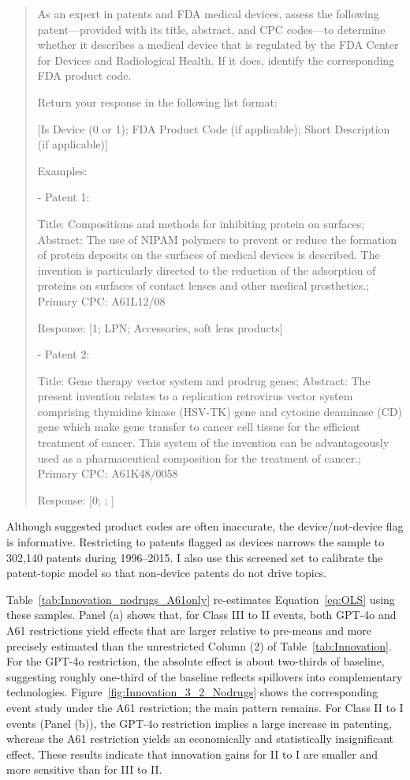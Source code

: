\documentclass[letterpaper,12pt]{article}
\theoremstyle{definition}
\begin{document}
\begin{quote}
As an expert in patents and FDA medical devices, assess the following patent---provided with its title, abstract, and CPC codes---to determine whether it describes a medical device that is regulated by the FDA Center for Devices and Radiological Health. If it does, identify the corresponding FDA product code.

Return your response in the following list format:

[Is Device (0 or 1); FDA Product Code (if applicable); Short Description (if applicable)]

Examples:

- Patent 1:

  Title: Compositions and methods for inhibiting protein on surfaces; 
  Abstract: The use of NIPAM polymers to prevent or reduce the formation of protein deposits on the surfaces of medical devices is described. The invention is particularly directed to the reduction of the adsorption of proteins on surfaces of contact lenses and other medical prosthetics.; 
  Primary CPC: A61L12/08

  Response: [1; LPN; Accessories, soft lens products]

- Patent 2:

  Title: Gene therapy vector system and prodrug genes; 
  Abstract: The present invention relates to a replication retrovirus vector system comprising thymidine kinase (HSV-TK) gene and cytosine deaminase (CD) gene which make gene transfer to cancer cell tissue for the efficient treatment of cancer. This system of the invention can be advantageously used as a pharmaceutical composition for the treatment of cancer.; 
  Primary CPC: A61K48/0058

  Response: [0; ; ]
\end{quote}



Although suggested product codes are often inaccurate, the device/not-device flag is informative. Restricting to patents flagged as devices narrows the sample to 302{,}140 patents during 1996–2015. I also use this screened set to calibrate the patent-topic model so that non-device patents do not drive topics.


Table~\ref{tab:Innovation_nodrugs_A61only} re-estimates Equation~\ref{eq:OLS} using these samples. Panel (a) shows that, for Class III to II events, both GPT-4o and A61 restrictions yield effects that are larger relative to pre-means and more precisely estimated than the unrestricted Column (2) of Table~\ref{tab:Innovation}. For the GPT-4o restriction, the absolute effect is about two-thirds of baseline, suggesting roughly one-third of the baseline reflects spillovers into complementary technologies. Figure~\ref{fig:Innovation_3_2_Nodrugs} shows the corresponding event study under the A61 restriction; the main pattern remains. For Class II to I events (Panel (b)), the GPT-4o restriction implies a large increase in patenting, whereas the A61 restriction yields an economically and statistically insignificant effect. These results indicate that innovation gains for II to I are smaller and more sensitive than for III to II.
\end{document}
